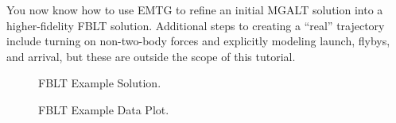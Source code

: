 \documentclass[11pt]{article}
\begin{document}
\noindent You now know how to use \ac{EMTG} to refine an initial \ac{MGALT} solution into a higher-fidelity \ac{FBLT} solution. Additional steps to creating a ``real'' trajectory include turning on non-two-body forces and explicitly modeling launch, flybys, and arrival, but these are outside the scope of this tutorial.

\begin{figure}[H]
	\centering
	\caption{\label{fig:med_high_fidelity_traj_plot}\ac{FBLT} Example Solution.}
\end{figure}

\begin{figure}[H]
	\centering
	\caption{\label{fig:med_high_fidelity_data_plot}\ac{FBLT} Example Data Plot.}
\end{figure}
\end{document}
